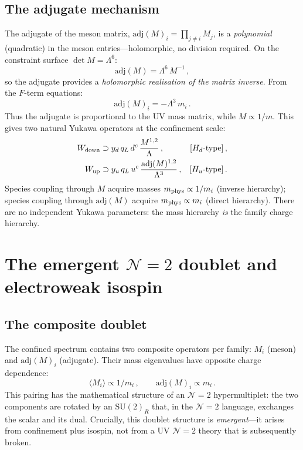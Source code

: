\documentclass[12pt,a4paper]{article}
\newcommand{\SU}{\mathrm{SU}}
\newcommand{\adj}{\mathrm{adj}}
\begin{document}
\subsection{The adjugate mechanism}

The adjugate of the meson matrix,
$\adj(M)_i = \prod_{j \neq i} M_j$, is a
\emph{polynomial} (quadratic) in the meson entries---holomorphic,
no division required.
On the constraint surface $\det M = \Lambda^6$:
\begin{equation}
  \adj(M) = \Lambda^6\,M^{-1}\,,
  \label{eq:adjugate}
\end{equation}
so the adjugate provides a \emph{holomorphic realisation of the
matrix inverse}.
From the $F$-term equations:
\begin{equation}
  \adj(M)_i = -\Lambda^3\,m_i\,.
  \label{eq:Fterm}
\end{equation}
Thus the adjugate is proportional to the UV mass matrix,
while $M \propto 1/m$.
This gives two natural Yukawa operators at the confinement scale:
\begin{align}
  W_{\rm down} &\supset y_d\,q_L\,d^c\,\frac{M^{1,2}}{\Lambda}\,,
  & [H_d\text{-type}]\,,
  \label{eq:W_down} \\
  W_{\rm up} &\supset y_u\,q_L\,u^c\,
    \frac{\adj(M)^{1,2}}{\Lambda^3}\,,
  & [H_u\text{-type}]\,.
  \label{eq:W_up}
\end{align}
Species coupling through $M$ acquire masses
$m_{\rm phys} \propto 1/m_i$ (inverse hierarchy);
species coupling through $\adj(M)$ acquire
$m_{\rm phys} \propto m_i$ (direct hierarchy).
There are no independent Yukawa parameters: the mass hierarchy
\emph{is} the family charge hierarchy.


\section{The emergent $\mathcal{N}{=}2$ doublet and electroweak isospin}
\label{sec:N2}

\subsection{The composite doublet}

The confined spectrum contains two composite operators per
family: $M_i$ (meson) and $\adj(M)_i$ (adjugate).
Their mass eigenvalues have opposite charge dependence:
\begin{equation}
  \langle M_i \rangle \propto 1/m_i\,,
  \qquad
  \adj(M)_i \propto m_i\,.
  \label{eq:doublet}
\end{equation}
This pairing has the mathematical structure of an
$\mathcal{N}{=}2$ hypermultiplet: the two components are
rotated by an $\SU(2)_R$ that, in the $\mathcal{N}{=}2$ language,
exchanges the scalar and its dual.
Crucially, this doublet structure is \emph{emergent}---it arises
from confinement plus isospin, not from a UV $\mathcal{N}{=}2$
theory that is subsequently broken.
\end{document}
